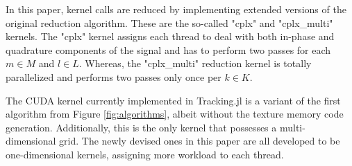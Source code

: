 \documentclass{juliacon}
\begin{document}
In this paper, kernel calls are reduced by implementing extended versions of the original reduction algorithm. These are the so-called "cplx" and "cplx\_multi" kernels. The "cplx" kernel assigns each thread to deal with both in-phase and quadrature components of the signal and has to perform two passes for each $m \in M$ and $l \in L$. Whereas, the "cplx\_multi" reduction kernel is totally parallelized and performs two passes only once per $k \in K$.

The CUDA kernel currently implemented in Tracking.jl is a variant of the first algorithm from Figure \ref{fig:algorithms}, albeit without the texture memory code generation. Additionally, this is the only kernel that possesses a multi-dimensional grid. The newly devised ones in this paper are all developed to be one-dimensional kernels, assigning more workload to each thread.
\end{document}
